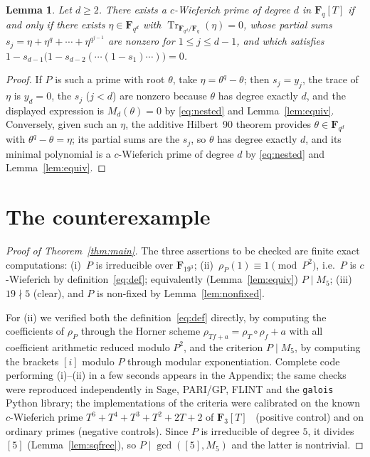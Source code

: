 \documentclass[11pt]{amsart}
\newcommand{\F}{\mathbf{F}}
\newcommand{\Tr}{\operatorname{Tr}}
\theoremstyle{plain}
\newtheorem{lemma}[theorem]{Lemma}
\theoremstyle{definition}
\begin{document}
\begin{lemma}\label{lem:H90}
Let $d\ge2$. There exists a $c$-Wieferich prime of degree $d$ in $\F_q[T]$ if
and only if there exists $\eta\in\F_{q^d}$ with
$\Tr_{\F_{q^d}/\F_q}(\eta)=0$, whose partial sums
$s_j=\eta+\eta^q+\cdots+\eta^{q^{j-1}}$ are nonzero for $1\le j\le d-1$, and
which satisfies $1-s_{d-1}\bigl(1-s_{d-2}(\cdots(1-s_1)\cdots)\bigr)=0$.
\end{lemma}

\begin{proof}
If $P$ is such a prime with root $\theta$, take $\eta=\theta^q-\theta$; then
$s_j=y_j$, the trace of $\eta$ is $y_d=0$, the $s_j$ ($j<d$) are nonzero because
$\theta$ has degree exactly $d$, and the displayed expression is $M_d(\theta)=0$
by \eqref{eq:nested} and Lemma~\ref{lem:equiv}. Conversely, given such an
$\eta$, the additive Hilbert~90 theorem provides $\theta\in\F_{q^d}$ with
$\theta^q-\theta=\eta$; its partial sums are the $s_j$, so $\theta$ has degree
exactly $d$, and its minimal polynomial is a $c$-Wieferich prime of degree $d$
by \eqref{eq:nested} and Lemma~\ref{lem:equiv}.
\end{proof}

\section{The counterexample}

\begin{proof}[Proof of Theorem~\ref{thm:main}]
The three assertions to be checked are finite exact computations:
(i)~$P$ is irreducible over $\F_{19^3}$;
(ii)~$\rho_P(1)\equiv1\pmod{P^2}$, i.e.\ $P$ is $c$-Wieferich by
definition~\eqref{eq:def}; equivalently (Lemma~\ref{lem:equiv}) $P\mid M_5$;
(iii)~$19\nmid5$ (clear), and $P$ is non-fixed by Lemma~\ref{lem:nonfixed}.

For (ii) we verified both the definition~\eqref{eq:def} directly, by computing
the coefficients of $\rho_P$ through the Horner scheme
$\rho_{Tf+a}=\rho_T\circ\rho_f+a$ with all coefficient arithmetic reduced
modulo $P^2$, and the criterion $P\mid M_5$, by computing the brackets $[i]$
modulo $P$ through modular exponentiation. Complete code performing (i)--(ii) in
a few seconds appears in the Appendix; the same checks were reproduced
independently in Sage, PARI/GP, FLINT and the \texttt{galois} Python library;
the implementations of the criteria were calibrated on the known $c$-Wieferich
prime $T^6+T^4+T^3+T^2+2T+2$ of $\F_3[T]$~\cite{BB} (positive control) and on
ordinary primes (negative controls). Since $P$ is irreducible of degree $5$, it
divides $[5]$ (Lemma~\ref{lem:sqfree}), so $P\mid\gcd([5],M_5)$ and the latter
is nontrivial.
\end{proof}
\end{document}
